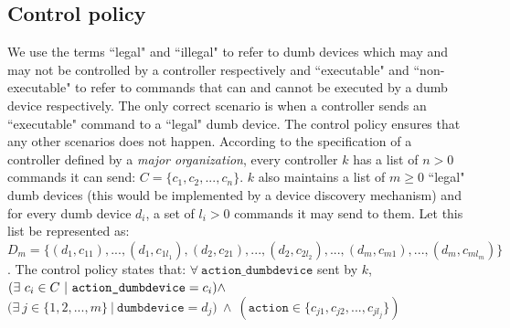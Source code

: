 \documentclass{article}
\begin{document}
\subsection{Control policy}
\label{subsec:control}
We use the terms ``legal" and ``illegal" to refer to dumb devices which may and may not be controlled by a controller respectively and ``executable" and ``non-executable" to refer to commands that can and cannot be executed by a dumb device respectively. The only correct scenario is when a controller sends an ``executable" command to a ``legal" dumb device. 
The control policy ensures that any other scenarios does not happen. According to the specification of a controller defined by a \textit{major organization}, every controller $k$ has a list of $n > 0$ commands it can send: $ C = \{c_1, c_2, ..., c_n\}$. $k$ also maintains a list of $m \geq 0$ ``legal" dumb devices (this would be implemented by a device discovery mechanism) and for every dumb device $d_i$,  a set of $l_i > 0$ commands it may send to them. Let this list be represented as: \\ $D_{m}= \{(d_{1}, c_{11}), ..., (d_{1}, c_{1l_1}), (d_{2}, c_{21}), ..., (d_{2}, c_{2l_2}), ..., (d_{m}, c_{m1}), ..., (d_m, c_{ml_m})\}$. The control policy states that: $\forall~\mathit{\texttt{action\_dumbdevice}}$ sent by $k$, 
$(\exists~ c_i \in C~|~\texttt{action\_dumbdevice} = c_i) \\ \wedge~$
$ (\exists~ j \in \{1, 2, ..., m\}~|~ \mathit{\texttt{dumbdevice} = d_j)}~\wedge~(\texttt{action} \in \{c_{j1}, c_{j2}, ..., c_{jl_j}\})$
\end{document}
